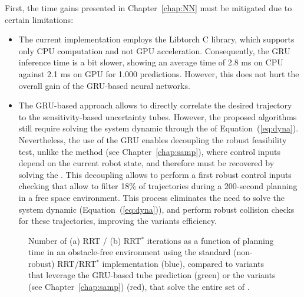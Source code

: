 First, the time gains presented in Chapter~\ref{chap:NN} must be mitigated due to certain limitations:
\begin{itemize}
    \item The current implementation employs the Libtorch C library, which supports only CPU computation and not GPU acceleration.
    Consequently, the GRU inference time is a bit slower, showing an average time of 2.8 ms on CPU against 2.1 ms on GPU for 1.000 predictions.
    However, this does not hurt the overall gain of the GRU-based neural networks.
    \item The GRU-based approach allows to directly correlate the desired trajectory to the sensitivity-based uncertainty tubes.
    However, the proposed  algorithms still require solving the system dynamic through the  of Equation~(\ref{eq:dyna}).
    Nevertheless, the use of the GRU enables decoupling the robust feasibility test, unlike the  method (see Chapter~\ref{chap:samp}), where control inputs depend on the current robot state, and therefore must be recovered by solving the .
    This decoupling allows to perform a first robust control inputs checking that allow to filter 18\% of trajectories during a 200-second planning in a free space environment.
    This process eliminates the need to solve the system dynamic  (Equation~(\ref{eq:dyna})), and perform robust collision checks for these trajectories, improving the  variants efficiency.
\end{itemize}

\begin{figure} [h!]
    \centering
    \caption{Number of (a) RRT / (b) RRT$^*$ iterations as a function of planning time in an obstacle-free environment using the standard (non-robust) RRT/RRT$^*$ implementation (blue), compared to  variants that leverage the GRU-based tube prediction (green) or the  variants (see Chapter~\ref{chap:samp}) (red), that solve the entire set of .}%
    \label{fig: NNTime}%
\end{figure}

